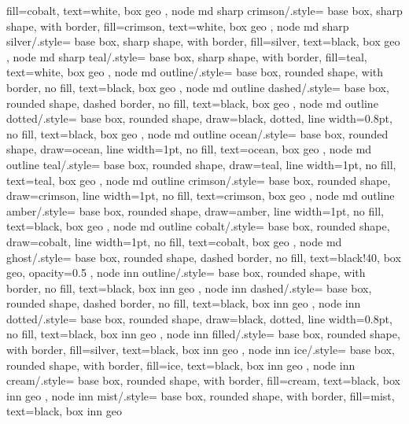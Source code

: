 {{		fill=cobalt, text=white, box geo
	},
	node md sharp crimson/.style={
		base box, sharp shape, with border,
		fill=crimson, text=white, box geo
	},
	node md sharp silver/.style={
		base box, sharp shape, with border,
		fill=silver, text=black, box geo
	},
	node md sharp teal/.style={
		base box, sharp shape, with border,
		fill=teal, text=white, box geo
	},
	node md outline/.style={
		base box, rounded shape, with border,
		no fill, text=black, box geo
	},
	node md outline dashed/.style={
		base box, rounded shape, dashed border,
		no fill, text=black, box geo
	},
	node md outline dotted/.style={
		base box, rounded shape,
		draw=black, dotted, line width=0.8pt,
		no fill, text=black, box geo
	},
	node md outline ocean/.style={
		base box, rounded shape,
		draw=ocean, line width=1pt,
		no fill, text=ocean, box geo
	},
	node md outline teal/.style={
		base box, rounded shape,
		draw=teal, line width=1pt,
		no fill, text=teal, box geo
	},
	node md outline crimson/.style={
		base box, rounded shape,
		draw=crimson, line width=1pt,
		no fill, text=crimson, box geo
	},
	node md outline amber/.style={
		base box, rounded shape,
		draw=amber, line width=1pt,
		no fill, text=black, box geo
	},
	node md outline cobalt/.style={
		base box, rounded shape,
		draw=cobalt, line width=1pt,
		no fill, text=cobalt, box geo
	},
	node md ghost/.style={
		base box, rounded shape, dashed border,
		no fill, text=black!40, box geo,
		opacity=0.5
	},
	node inn outline/.style={
		base box, rounded shape, with border,
		no fill, text=black, box inn geo
	},
	node inn dashed/.style={
		base box, rounded shape, dashed border,
		no fill, text=black, box inn geo
	},
	node inn dotted/.style={
		base box, rounded shape,
		draw=black, dotted, line width=0.8pt,
		no fill, text=black, box inn geo
	},
	node inn filled/.style={
		base box, rounded shape, with border,
		fill=silver, text=black, box inn geo
	},
	node inn ice/.style={
		base box, rounded shape, with border,
		fill=ice, text=black, box inn geo
	},
	node inn cream/.style={
		base box, rounded shape, with border,
		fill=cream, text=black, box inn geo
	},
	node inn mist/.style={
		base box, rounded shape, with border,
		fill=mist, text=black, box inn geo
}}
